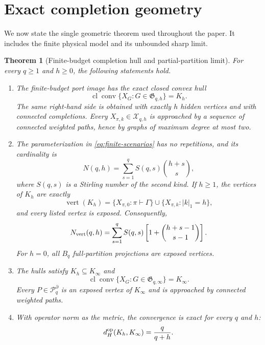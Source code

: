 \documentclass[11pt]{article}
\newtheorem{theorem}{Theorem}
\theoremstyle{definition}
\theoremstyle{remark}
\newcommand{\conv}{\operatorname{conv}}
\newcommand{\cl}{\operatorname{cl}}
\newcommand{\cX}{\mathcal X}
\newcommand{\cP}{\mathcal P}
\newcommand{\fG}{\mathfrak G}
\begin{document}
\section{Exact completion geometry}

We now state the single geometric theorem used throughout the paper.  It
includes the finite physical model and its unbounded sharp limit.

\begin{theorem}[Finite-budget completion hull and partial-partition limit]
\label{thm:main}
For every $q\geq1$ and $h\geq0$, the following statements hold.

\begin{enumerate}[label=\textup{(\roman*)},leftmargin=2.1em]
\item The finite-budget port image has the exact closed convex hull
\begin{equation}
  \cl\conv\{X_G:G\in\fG_{q,h}\}=K_h.
  \label{eq:finite-hull}
\end{equation}
The same right-hand side is obtained with exactly $h$ hidden vertices and
with connected completions.  Every $X_{\pi,k}\in\cX_{q,h}$ is approached by
a sequence of connected weighted paths, hence by graphs of maximum degree at
most two.

\item The parameterization in \eqref{eq:finite-scenarios} has no repetitions,
and its cardinality is
\begin{equation}
  N(q,h)=\sum_{s=1}^q S(q,s)\binom{h+s}{s},
  \label{eq:candidate-count}
\end{equation}
where $S(q,s)$ is a Stirling number of the second kind.  If $h\geq1$, the
vertices of $K_h$ are exactly
\begin{equation}
  \operatorname{vert}(K_h)
  =\{X_{\pi,0}:\pi\vdash\Gamma\}
   \cup
   \{X_{\pi,k}:|k|_1=h\},
  \label{eq:finite-vertices}
\end{equation}
and every listed vertex is exposed.  Consequently,
\begin{equation}
  N_{\rm vert}(q,h)
  =\sum_{s=1}^q S(q,s)
       \left[1+\binom{h+s-1}{s-1}\right].
  \label{eq:vertex-count}
\end{equation}
For $h=0$, all $B_q$ full-partition projections are exposed vertices.

\item The hulls satisfy $K_h\subseteq K_\infty$ and
\begin{equation}
  \cl\conv\{X_G:G\in\fG_{q,\infty}\}=K_\infty.
  \label{eq:unbounded-hull}
\end{equation}
Every $P\in\cP_q^\partial$ is an exposed vertex of $K_\infty$ and is
approached by connected weighted paths.

\item With operator norm as the metric, the convergence is exact for every
$q$ and $h$:
\begin{equation}
  d_H^{\rm op}(K_h,K_\infty)=\frac{q}{q+h}.
  \label{eq:hausdorff}
\end{equation}
\end{enumerate}
\end{theorem}
\end{document}
